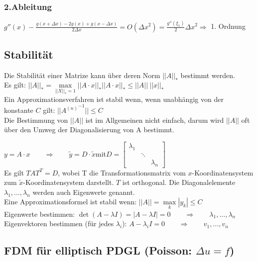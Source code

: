 \subsubsection{2.Ableitung}
$g''(x) - \frac{g(x+\Delta x) -2 g(x)+ g(x-\Delta x)}{2\Delta x}= O(\Delta x^2)
= \frac{g''(\xi_1)}{2}\Delta x^2 \Rightarrow$ 1. Ordnung

\subsection{Stabilität}
Die Stabilität einer Matrize kann über deren Norm $||A||_*$ bestimmt werden.\\

Es gilt: $||A||_*=\max\limits_{||X||_*=1}||A\cdot x||_*$\qquad$||A\cdot x||_*\leq||A||~||x||_*$\\

Ein Approximationsverfahren ist stabil wenn, wenn unabhängig von der konstante $C$ gilt:
$\boxed{||{A^{(n)}}^{-1}||\leq C}$\\



Die Bestimmung von $||A||$ ist im Allgemeinen nicht einfach, darum wird $||A||$ oft über den Umweg der Diagonalisierung von A bestimmt.

$y=A\cdot x\qquad\Rightarrow\qquad\tilde{y}=D\cdot\tilde{x}$\qquad mit\qquad $D=\begin{bmatrix}\lambda_1&&\\&\ddots&\\&&\lambda_n\end{bmatrix}$\\

Es gilt $TAT^T=D$, wobei T die Transformationsmatrix vom $x$-Koordinatensystem zum $\tilde{x}$-Koordinatensystem darstellt. $T$ ist orthogonal.
Die Diagonalelemente $\lambda_1,\ldots,\lambda_n$ werden auch Eigenwerte genannt.\\

Eine Approximationsformel ist stabil wenn: $\boxed{||A||=\max\limits_{k}|y_k|\leq C}$\\

Eigenwerte bestimmen: $\boxed{\det(A-\lambda I)=|A-\lambda I|=0}\qquad \Rightarrow \qquad \lambda_1,\ldots,\lambda_n$\\
Eigenvektoren bestimmen (für jedes $\lambda_i$): $A-\lambda_i I=0\qquad \Rightarrow \qquad v_1,\ldots,v_n$\\

\subsection{FDM für elliptisch PDGL (Poisson: $\Delta u = f$)}

